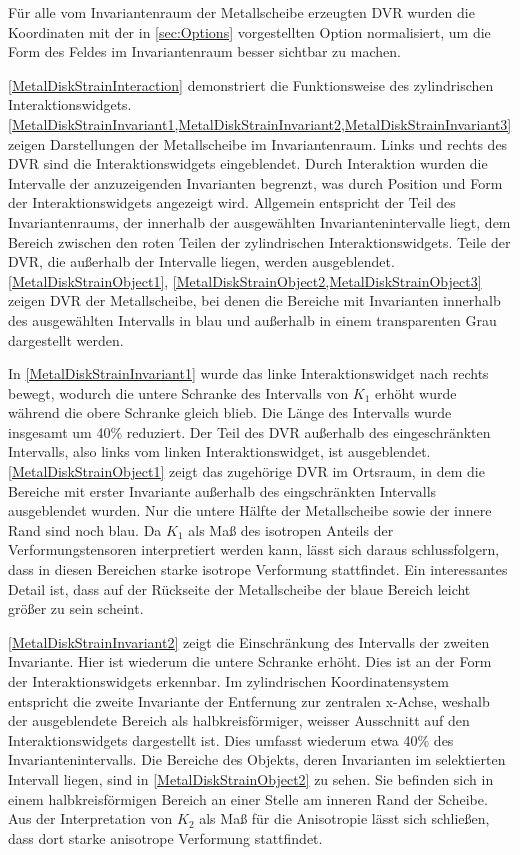 \documentclass[a4paper,fontsize=12pt,toc=bib,parskip=half,ngerman]{scrartcl}
\begin{document}
F\"ur alle vom Invariantenraum der Metallscheibe erzeugten DVR wurden die Koordinaten mit der in \ref{sec:Options} vorgestellten Option normalisiert, um die Form des Feldes im Invariantenraum besser sichtbar zu machen.

\cref{MetalDiskStrainInteraction} demonstriert die Funktionsweise des zylindrischen Interaktionswidgets. \cref{MetalDiskStrainInvariant1,MetalDiskStrainInvariant2,MetalDiskStrainInvariant3} zeigen Darstellungen der Metallscheibe im Invariantenraum. Links und rechts des DVR sind die Interaktionswidgets eingeblendet. Durch Interaktion wurden die Intervalle der anzuzeigenden Invarianten begrenzt, was durch Position und Form der Interaktionswidgets angezeigt wird. Allgemein entspricht der Teil des Invariantenraums, der innerhalb der ausgew\"ahlten Invariantenintervalle liegt, dem Bereich zwischen den roten Teilen der zylindrischen Interaktionswidgets. Teile der DVR, die au{\ss}erhalb der Intervalle liegen, werden ausgeblendet. \cref{MetalDiskStrainObject1}, \cref{MetalDiskStrainObject2,MetalDiskStrainObject3} zeigen DVR der Metallscheibe, bei denen die Bereiche mit Invarianten innerhalb des ausgew\"ahlten Intervalls in blau und au{\ss}erhalb in einem transparenten Grau dargestellt werden.

In \cref{MetalDiskStrainInvariant1} wurde das linke Interaktionswidget nach rechts bewegt, wodurch die untere Schranke des Intervalls von $K_1$ erh\"oht wurde w\"ahrend die obere Schranke gleich blieb. Die L\"ange des Intervalls wurde insgesamt um 40\% reduziert. Der Teil des DVR au{\ss}erhalb des eingeschr\"ankten Intervalls, also links vom linken Interaktionswidget, ist ausgeblendet. \cref{MetalDiskStrainObject1} zeigt das zugeh\"orige DVR im Ortsraum, in dem die Bereiche mit erster Invariante au{\ss}erhalb des eingschr\"ankten Intervalls ausgeblendet wurden. Nur die untere H\"alfte der Metallscheibe sowie der innere Rand sind noch blau. Da $K_1$ als Ma{\ss} des isotropen Anteils der Verformungstensoren interpretiert werden kann, l\"asst sich daraus schlussfolgern, dass in diesen Bereichen starke isotrope Verformung stattfindet. Ein interessantes Detail ist, dass auf der R\"uckseite der Metallscheibe der blaue Bereich leicht gr\"o{\ss}er zu sein scheint.

\cref{MetalDiskStrainInvariant2} zeigt die Einschr\"ankung des Intervalls der zweiten Invariante. Hier ist wiederum die untere Schranke erh\"oht. Dies ist an der Form der Interaktionswidgets erkennbar. Im zylindrischen Koordinatensystem entspricht die zweite Invariante der Entfernung zur zentralen x-Achse, weshalb der ausgeblendete Bereich als halbkreisf\"ormiger, weisser Ausschnitt auf den Interaktionswidgets dargestellt ist. Dies umfasst wiederum etwa 40\% des Invariantenintervalls. Die Bereiche des Objekts, deren Invarianten im selektierten Intervall liegen, sind in \cref{MetalDiskStrainObject2} zu sehen. Sie befinden sich in einem halbkreisf\"ormigen Bereich an einer Stelle am inneren Rand der Scheibe. Aus der Interpretation von $K_2$ als Ma{\ss} f\"ur die Anisotropie l\"asst sich schlie{\ss}en, dass dort starke anisotrope Verformung stattfindet.
\end{document}
